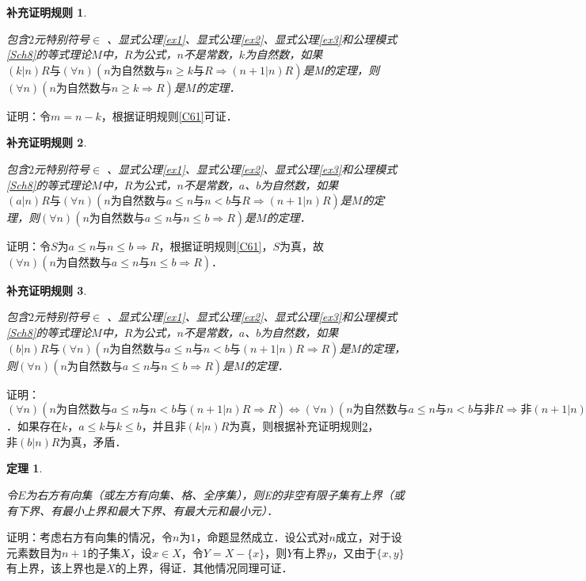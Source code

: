 \documentclass[12pt, a4paper, oneside]{book}
\newtheorem{Ccor}{补充证明规则}
\newtheorem{theo}{定理}
\begin{document}
			\begin{Ccor}\label{Ccor88}
				\hfill\par
				包含$2$元特别符号$\in$ 、显式公理\ref{ex1}、显式公理\ref{ex2}、显式公理\ref{ex3}和公理模式\ref{Sch8}的等式理论$M$中，$R$为公式，$n$不是常数，$k$为自然数，如果$(k|n)R\text{与}(\forall n)(n\text{为自然数}\text{与}n\geq k\text{与}R\Rightarrow (n+1|n)R)$是M的定理，则$(\forall n)(n\text{为自然数}\text{与}n\geq k\Rightarrow R)$是$M$的定理．
			\end{Ccor}
			证明：令$m=n-k$，根据证明规则\ref{C61}可证．
			
			\begin{Ccor}\label{Ccor89}
				\hfill\par
				包含$2$元特别符号$\in$ 、显式公理\ref{ex1}、显式公理\ref{ex2}、显式公理\ref{ex3}和公理模式\ref{Sch8}的等式理论$M$中，$R$为公式，$n$不是常数，$a$、$b$为自然数，如果$(a|n)R\text{与}(\forall n)(n\text{为自然数}\text{与}a\leq n\text{与}n<b\text{与}R \Rightarrow (n+1|n)R)$是$M$的定理，则$(\forall n)(n\text{为自然数}\text{与}a\leq n\text{与}n\leq b \Rightarrow R)$是$M$的定理．
			\end{Ccor}
			证明：令$S$为$a\leq n\text{与}n\leq b \Rightarrow R$，根据证明规则\ref{C61}，$S$为真，故$(\forall n)(n\text{为自然数}\text{与}a\leq n\text{与}n\leq b \Rightarrow R)$．
						
			\begin{Ccor}\label{Ccor90}
				\hfill\par
				包含$2$元特别符号$\in$ 、显式公理\ref{ex1}、显式公理\ref{ex2}、显式公理\ref{ex3}和公理模式\ref{Sch8}的等式理论$M$中，$R$为公式，$n$不是常数，$a$、$b$为自然数，如果$(b|n)R\text{与}(\forall n)(n\text{为自然数}\text{与}a\leq n\text{与}n<b\text{与}(n+1|n)R \Rightarrow R)$是$M$的定理，则$(\forall n)(n\text{为自然数}\text{与}a\leq n\text{与}n\leq b \Rightarrow R)$是$M$的定理．
			\end{Ccor}
			证明：$(\forall n)(n\text{为自然数}\text{与}a\leq n\text{与}n<b\text{与}(n+1|n)R \Rightarrow R)\Leftrightarrow (\forall n)(n\text{为自然数}\text{与}a\leq n\text{与}n<b\text{与}\text{非}R \Rightarrow \text{非}(n+1|n)R)$．如果存在$k$，$a\leq k\text{与}k\leq b$，并且$\text{非}(k|n)R$为真，则根据补充证明规则\ref{Ccor89}，$\text{非}(b|n)R$为真，矛盾．
						
			\begin{theo}\label{theo121}
				\hfill\par
				令$E$为右方有向集（或左方有向集、格、全序集），则E的非空有限子集有上界（或有下界、有最小上界和最大下界、有最大元和最小元）．
			\end{theo}
			证明：考虑右方有向集的情况，令$n$为$1$，命题显然成立．设公式对$n$成立，对于设元素数目为$n+1$的子集$X$，设$x\in X$，令$Y=X-\{x\}$，则$Y$有上界$y$，又由于$\{x, y\}$有上界，该上界也是$X$的上界，得证．其他情况同理可证．
						
\end{document}
